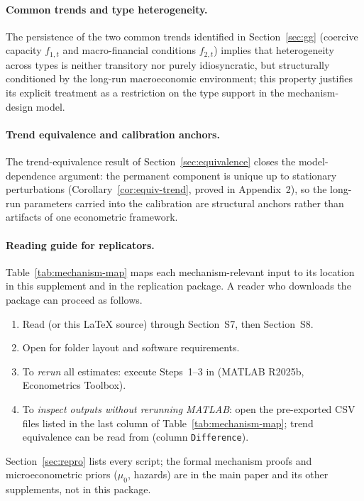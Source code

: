 \documentclass[ecta,nameyear,final,supplement]{econsocart}
\numberwithin{equation}{section}
\numberwithin{table}{section}
\theoremstyle{definition}
\begin{document}
\paragraph{Common trends and type heterogeneity.}
The persistence of the two common trends identified in Section~\ref{sec:gg}
(coercive capacity $f_{1,t}$ and macro-financial conditions $f_{2,t}$)
implies that heterogeneity across types is neither transitory nor purely
idiosyncratic, but structurally conditioned by the long-run macroeconomic
environment; this property justifies its explicit treatment as a restriction
on the type support in the mechanism-design model.

\paragraph{Trend equivalence and calibration anchors.}
The trend-equivalence result of Section~\ref{sec:equivalence} closes the
model-dependence argument: the permanent component is unique up to stationary
perturbations (Corollary~\ref{cor:equiv-trend}, proved in Appendix~2), so the
long-run parameters carried into the calibration are structural anchors rather
than artifacts of one econometric framework.

\paragraph{Reading guide for replicators.}
Table~\ref{tab:mechanism-map} maps each mechanism-relevant input to its
location in this supplement and in the replication package. A reader who
downloads the package can proceed as follows.
\begin{enumerate}
\item Read  (or this \LaTeX{} source) through
Section~S7, then Section~S8.
\item Open  for folder layout and software requirements.
\item To \emph{rerun} all estimates: execute Steps~1--3 in 
(MATLAB R2025b, Econometrics Toolbox).
\item To \emph{inspect outputs without rerunning MATLAB}: open the pre-exported
CSV files listed in the last column of Table~\ref{tab:mechanism-map}; trend
equivalence can be read from 
(column \texttt{Difference}).
\end{enumerate}
Section~\ref{sec:repro} lists every script; the formal mechanism proofs and
microeconometric priors ($\mu_0$, hazards) are in the main paper and its
other supplements, not in this package.
\end{document}
